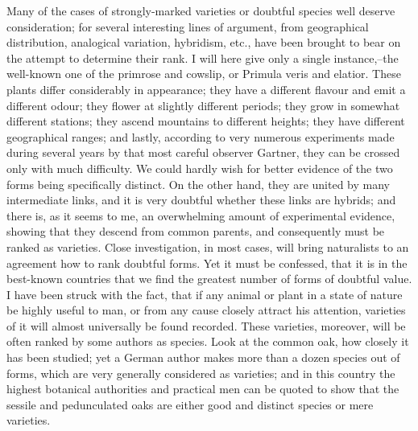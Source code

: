 Many of the cases of strongly-marked varieties or doubtful species well deserve consideration; for several interesting lines of argument, from geographical distribution, analogical variation, hybridism, etc., have been brought to bear on the attempt to determine their rank. I will here give only a single instance,--the well-known one of the primrose and cowslip, or Primula veris and elatior. These plants differ considerably in appearance; they have a different flavour and emit a different odour; they flower at slightly different periods; they grow in somewhat different stations; they ascend mountains to different heights; they have different geographical ranges; and lastly, according to very numerous experiments made during several years by that most careful observer Gartner, they can be crossed only with much difficulty. We could hardly wish for better evidence of the two forms being specifically distinct. On the other hand, they are united by many intermediate links, and it is very doubtful whether these links are hybrids; and there is, as it seems to me, an overwhelming amount of experimental evidence, showing that they descend from common parents, and consequently must be ranked as varieties.
Close investigation, in most cases, will bring naturalists to an agreement how to rank doubtful forms. Yet it must be confessed, that it is in the best-known countries that we find the greatest number of forms of doubtful value. I have been struck with the fact, that if any animal or plant in a state of nature be highly useful to man, or from any cause closely attract his attention, varieties of it will almost universally be found recorded. These varieties, moreover, will be often ranked by some authors as species. Look at the common oak, how closely it has been studied; yet a German author makes more than a dozen species out of forms, which are very generally considered as varieties; and in this country the highest botanical authorities and practical men can be quoted to show that the sessile and pedunculated oaks are either good and distinct species or mere varieties.
